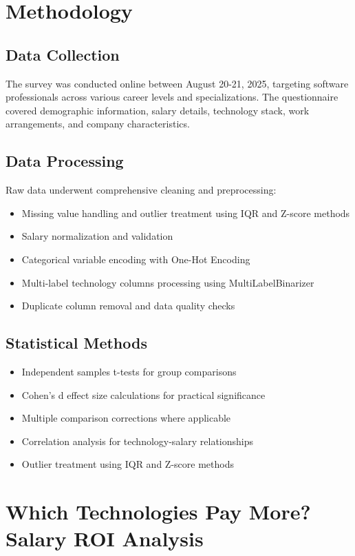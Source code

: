 \documentclass[12pt,a4paper]{article}
\begin{document}
\section{Methodology}

\subsection{Data Collection}
The survey was conducted online between August 20-21, 2025, targeting software professionals across various career levels and specializations. The questionnaire covered demographic information, salary details, technology stack, work arrangements, and company characteristics.

\subsection{Data Processing}
Raw data underwent comprehensive cleaning and preprocessing:
\begin{itemize}
    \item Missing value handling and outlier treatment using IQR and Z-score methods
    \item Salary normalization and validation
    \item Categorical variable encoding with One-Hot Encoding
    \item Multi-label technology columns processing using MultiLabelBinarizer
    \item Duplicate column removal and data quality checks
\end{itemize}

\subsection{Statistical Methods}
\begin{itemize}
    \item Independent samples t-tests for group comparisons
    \item Cohen's d effect size calculations for practical significance
    \item Multiple comparison corrections where applicable
    \item Correlation analysis for technology-salary relationships
    \item Outlier treatment using IQR and Z-score methods
\end{itemize}

\section{Which Technologies Pay More? Salary ROI Analysis}
\end{document}
